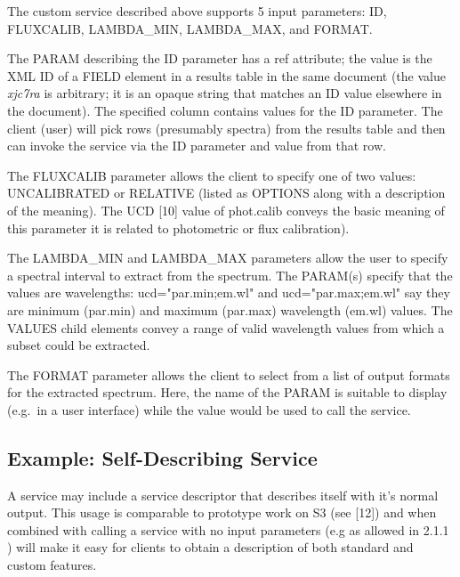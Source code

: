 \documentclass[11pt,a4paper]{ivoa}
\newcommand{\attval}[2]{#1={\allowbreak}{"}#2{"}}
\begin{document}
The custom service described above supports 5 input parameters: ID,
FLUXCALIB, LAMBDA\_MIN, LAMBDA\_MAX, and FORMAT.

The PARAM describing the ID parameter has a ref attribute; the value is
the XML ID of a FIELD element in a results table in the same document
(the value {\em xjc7ra\/} is arbitrary;
it is an opaque string that matches
an ID value elsewhere in the document). The specified column contains
values for the ID parameter. The client (user) will pick rows (presumably
spectra) from the results table and then can invoke the service via the
ID parameter and value from that row.

The FLUXCALIB parameter allows the client to specify one of two values:
UNCALIBRATED or RELATIVE (listed as OPTIONS along with a description of
the meaning). The UCD [10] value of phot.calib conveys the basic meaning
of this parameter it is related to photometric or flux calibration).

The LAMBDA\_MIN and LAMBDA\_MAX parameters allow the user to specify a
spectral interval to extract from the spectrum. The PARAM(s) specify that
the values are wavelengths:
\attval{ucd}{par.min;em.wl} and
\attval{ucd}{par.max;em.wl}
say they are minimum (par.min) and maximum (par.max) wavelength (em.wl)
values. The VALUES child elements convey a range of valid wavelength
values from which a subset could be extracted.

The FORMAT parameter allows the client to select from a list of output
formats for the extracted spectrum. Here, the name of the PARAM is
suitable to display (e.g.\ in a user interface) while the value would be
used to call the service.


\subsection{Example: Self-Describing Service}

A service may include a service descriptor that describes itself with
it's normal output. This usage is comparable to prototype work on S3 (see
[12]) and when combined with calling a service with no input parameters
(e.g as allowed in 2.1.1 ) will make it easy for clients to obtain a
description of both standard and custom features.
\end{document}
